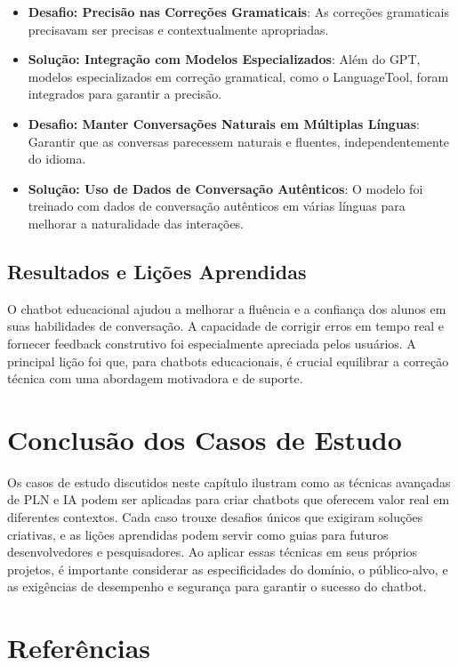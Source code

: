\documentclass[14pt,a4paper,oneside]{book}
\begin{document}
\begin{itemize}
	\item \textbf{Desafio: Precisão nas Correções Gramaticais}: As correções gramaticais precisavam ser precisas e contextualmente apropriadas.
	\item \textbf{Solução: Integração com Modelos Especializados}: Além do GPT, modelos especializados em correção gramatical, como o LanguageTool, foram integrados para garantir a precisão.
	\item \textbf{Desafio: Manter Conversações Naturais em Múltiplas Línguas}: Garantir que as conversas parecessem naturais e fluentes, independentemente do idioma.
	\item \textbf{Solução: Uso de Dados de Conversação Autênticos}: O modelo foi treinado com dados de conversação autênticos em várias línguas para melhorar a naturalidade das interações.
\end{itemize}

\subsection{Resultados e Lições Aprendidas}

O chatbot educacional ajudou a melhorar a fluência e a confiança dos alunos em suas habilidades de conversação. A capacidade de corrigir erros em tempo real e fornecer feedback construtivo foi especialmente apreciada pelos usuários. A principal lição foi que, para chatbots educacionais, é crucial equilibrar a correção técnica com uma abordagem motivadora e de suporte.

\section{Conclusão dos Casos de Estudo}

Os casos de estudo discutidos neste capítulo ilustram como as técnicas avançadas de PLN e IA podem ser aplicadas para criar chatbots que oferecem valor real em diferentes contextos. Cada caso trouxe desafios únicos que exigiram soluções criativas, e as lições aprendidas podem servir como guias para futuros desenvolvedores e pesquisadores. Ao aplicar essas técnicas em seus próprios projetos, é importante considerar as especificidades do domínio, o público-alvo, e as exigências de desempenho e segurança para garantir o sucesso do chatbot.

\section{Referências}
\end{document}
